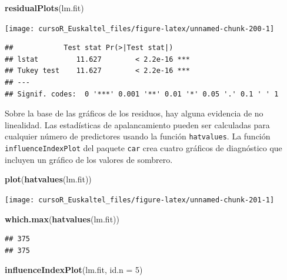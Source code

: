 \documentclass[]{book}
\newenvironment{Shaded}{\begin{snugshade}}{\end{snugshade}}
\newcommand{\KeywordTok}[1]{\textcolor[rgb]{0.13,0.29,0.53}{\textbf{#1}}}
\newcommand{\DataTypeTok}[1]{\textcolor[rgb]{0.13,0.29,0.53}{#1}}
\newcommand{\DecValTok}[1]{\textcolor[rgb]{0.00,0.00,0.81}{#1}}
\newcommand{\NormalTok}[1]{#1}
\begin{document}
\begin{Shaded}
\begin{Highlighting}[]
\KeywordTok{residualPlots}\NormalTok{(lm.fit)}
\end{Highlighting}
\end{Shaded}

\begin{center}\texttt{[image: cursoR\_Euskaltel\_files/figure-latex/unnamed-chunk-200-1]} \end{center}

\begin{verbatim}
##            Test stat Pr(>|Test stat|)    
## lstat         11.627        < 2.2e-16 ***
## Tukey test    11.627        < 2.2e-16 ***
## ---
## Signif. codes:  0 '***' 0.001 '**' 0.01 '*' 0.05 '.' 0.1 ' ' 1
\end{verbatim}

Sobre la base de las gráficos de los residuos, hay alguna evidencia de
no linealidad. Las estadísticas de apalancamiento pueden ser calculadas
para cualquier número de predictores usando la función
\texttt{hatvalues}. La función \texttt{influenceIndexPlot} del paquete
\texttt{car} crea cuatro gráficos de diagnóstico que incluyen un gráfico
de los valores de sombrero.

\begin{Shaded}
\begin{Highlighting}[]
\KeywordTok{plot}\NormalTok{(}\KeywordTok{hatvalues}\NormalTok{(lm.fit))}
\end{Highlighting}
\end{Shaded}

\begin{center}\texttt{[image: cursoR\_Euskaltel\_files/figure-latex/unnamed-chunk-201-1]} \end{center}

\begin{Shaded}
\begin{Highlighting}[]
\KeywordTok{which.max}\NormalTok{(}\KeywordTok{hatvalues}\NormalTok{(lm.fit))}
\end{Highlighting}
\end{Shaded}

\begin{verbatim}
## 375 
## 375
\end{verbatim}

\begin{Shaded}
\begin{Highlighting}[]
\KeywordTok{influenceIndexPlot}\NormalTok{(lm.fit, }\DataTypeTok{id.n =} \DecValTok{5}\NormalTok{)}
\end{Highlighting}
\end{Shaded}
\end{document}
